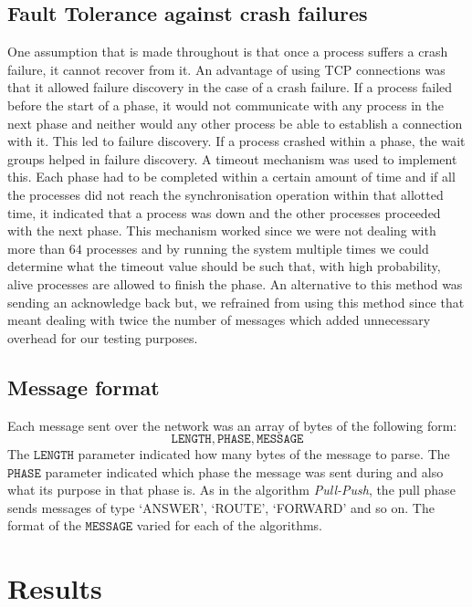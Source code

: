 \subsection{Fault Tolerance against crash failures}
One assumption that is made throughout is that once a process suffers a crash failure, it cannot recover from it. An advantage of using TCP connections was that it allowed failure discovery in the case of a crash failure. If a process failed before the start of a phase, it would not communicate with any process in the next phase and neither would any other process be able to establish a connection with it. This led to failure discovery. If a process crashed within a phase, the wait groups helped in failure discovery. A timeout mechanism was used to implement this. Each phase had to be completed within a certain amount of time and if all the processes did not reach the synchronisation operation within that allotted time, it indicated that a process was down and the other processes proceeded with the next phase. This mechanism worked since we were not dealing with more than $64$ processes and by running the system multiple times we could determine what the timeout value should be such that, with high probability, alive processes are allowed to finish the phase. An alternative to this method was sending an acknowledge back but, we refrained from using this method since that meant dealing with twice the number of messages which added unnecessary overhead for our testing purposes. 

\subsection{Message format}
Each message sent over the network was an array of bytes of the following form:
\begin{equation*}
    \mathtt{LENGTH}, \mathtt{PHASE}, \mathtt{MESSAGE}
\end{equation*}
The $\mathtt{LENGTH}$ parameter indicated how many bytes of the message to parse. The $\mathtt{PHASE}$ parameter indicated which phase the message was sent during and also what its purpose in that phase is. As in the algorithm \textit{Pull-Push}, the pull phase sends messages of type `ANSWER', `ROUTE', `FORWARD' and so on. The format of the $\mathtt{MESSAGE}$ varied for each of the algorithms.


\section{Results}
\label{sec:results}

